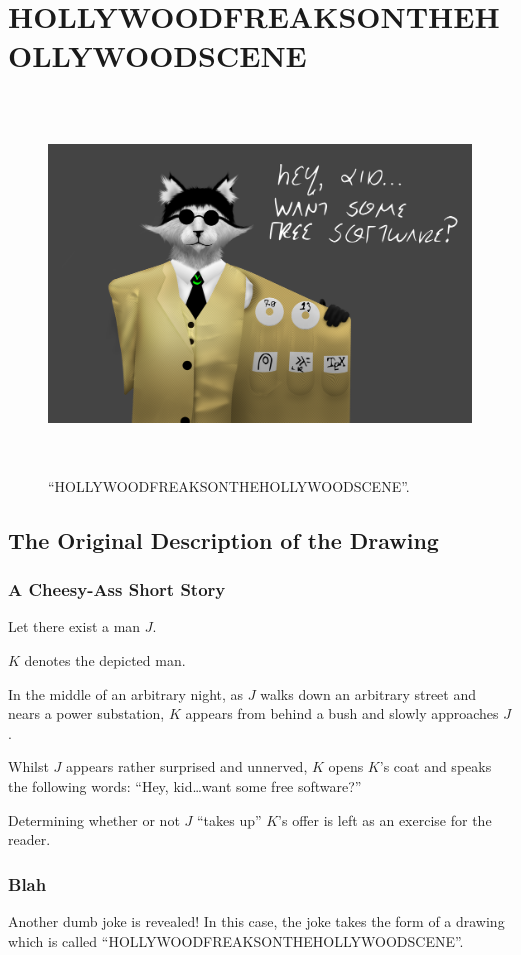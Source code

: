 \documentclass{report}
\newcommand\imageheight{10cm}
\begin{document}
\chapter{HOLLYWOODFREAKSONTHEHOLLYWOODSCENE}
\begin{figure}[ht]
	\centering
	\includegraphics[height=\imageheight]{hollywoodfreaksonthehollywoodscene/hollywoodfreaksonthehollywoodscene.png}
	\caption[center]{``HOLLYWOODFREAKSONTHEHOLLYWOODSCENE''.}
\end{figure}
\section{The Original Description of the Drawing}
\subsection{A Cheesy-Ass Short Story}
Let there exist a man $J$.

$K$ denotes the depicted man.

In the middle of an arbitrary night, as $J$ walks down an arbitrary street and nears a power substation, $K$ appears from behind a bush and slowly approaches $J$.

Whilst $J$ appears rather surprised and unnerved, $K$ opens $K$'s coat and speaks the following words: ``Hey, kid\ldots want some free software?''

Determining whether or not $J$ ``takes up'' $K$'s offer is left as an exercise for the reader.
\subsection{Blah}
Another dumb joke is revealed!  In this case, the joke takes the form of a drawing which is called ``HOLLYWOODFREAKSONTHEHOLLYWOODSCENE''.
\end{document}
